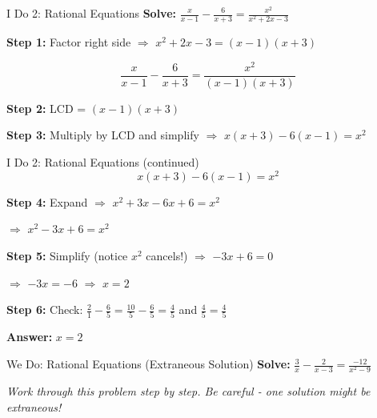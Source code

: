 \documentclass[12pt]{beamer}
\begin{document}
\begin{frame}{I Do 2: Rational Equations}
\textbf{Solve:} $\displaystyle\frac{x}{x-1} - \frac{6}{x+3} = \frac{x^2}{x^2+2x-3}$

\pause
\vspace{0.3cm}

\textbf{Step 1:} Factor right side $\Rightarrow$ $x^2 + 2x - 3 = (x-1)(x+3)$

\pause
$$\frac{x}{x-1} - \frac{6}{x+3} = \frac{x^2}{(x-1)(x+3)}$$

\pause
\vspace{0.3cm}

\textbf{Step 2:} LCD = $(x-1)(x+3)$

\pause
\vspace{0.3cm}

\textbf{Step 3:} Multiply by LCD and simplify $\Rightarrow$ $x(x+3) - 6(x-1) = x^2$
\end{frame}

\begin{frame}{I Do 2: Rational Equations (continued)}
$$x(x+3) - 6(x-1) = x^2$$

\pause
\vspace{0.3cm}

\textbf{Step 4:} Expand $\Rightarrow$ $x^2 + 3x - 6x + 6 = x^2$

\pause
$\Rightarrow$ $x^2 - 3x + 6 = x^2$

\pause
\vspace{0.3cm}

\textbf{Step 5:} Simplify (notice $x^2$ cancels!) $\Rightarrow$ $-3x + 6 = 0$

\pause
$\Rightarrow$ $-3x = -6$ \pause $\Rightarrow$ $x = 2$

\pause
\vspace{0.3cm}

\textbf{Step 6:} Check: $\displaystyle\frac{2}{1} - \frac{6}{5} = \frac{10}{5} - \frac{6}{5} = \frac{4}{5}$ and $\frac{4}{5} = \frac{4}{5}$ \checkmark

\pause
\vspace{0.3cm}

\Large \textbf{Answer:} $x = 2$
\end{frame}

\begin{frame}{We Do: Rational Equations (Extraneous Solution)}
\textbf{Solve:} $\displaystyle\frac{3}{x} - \frac{2}{x-3} = \frac{-12}{x^2-9}$

\vspace{2cm}

\textit{Work through this problem step by step. Be careful - one solution might be extraneous!}
\end{frame}
\end{document}
